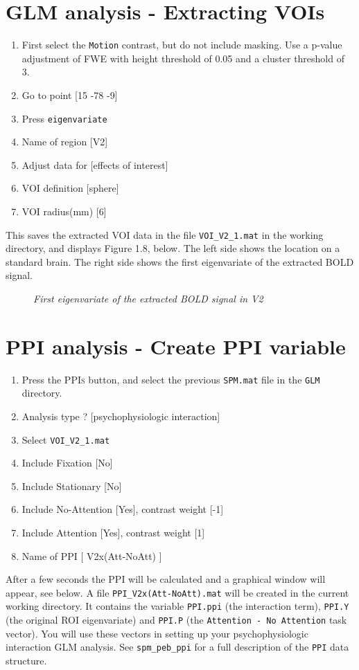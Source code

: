 \section{GLM analysis - Extracting VOIs}

\begin{enumerate}
\item First select the \texttt{Motion} contrast, but do not include masking. Use a p-value adjustment of FWE with height threshold of 0.05 and a cluster threshold of 3.
\item Go to point [15 -78 -9]
\item Press \texttt{eigenvariate}
\item Name of region [V2]
\item Adjust data for [effects of interest]
\item VOI definition [sphere]
\item VOI radius(mm) [6]
\end{enumerate}
This saves the extracted VOI data in the file \texttt{VOI\_V2\_1.mat} in the working directory, and displays Figure 1.8, below. The left side shows the location on a standard brain. The right side shows the first eigenvariate of the extracted BOLD signal.

\begin{figure}[!ht]
\centering{}
\caption{\em First eigenvariate of the extracted BOLD signal in V2}
\label{ppi_fig8}
\end{figure}

\section{PPI analysis - Create PPI variable}
\begin{enumerate}
\item Press the \textsc{PPIs} button, and select the previous \texttt{SPM.mat} file in the \texttt{GLM} directory.
\item Analysis type ? [psychophysiologic interaction]
\item Select \texttt{VOI\_V2\_1.mat}
\item Include Fixation [No]
\item Include Stationary [No]
\item Include No-Attention [Yes], contrast weight [-1]
\item Include Attention [Yes], contrast weight [1]
\item Name of PPI [ V2x(Att-NoAtt) ]
\end{enumerate}
After a few seconds the PPI will be calculated and a graphical window will appear, see below. A file \texttt{PPI\_V2x(Att-NoAtt).mat} will be created in the current working directory. It contains the variable \texttt{PPI.ppi} (the interaction term), \texttt{PPI.Y} (the original ROI eigenvariate) and \texttt{PPI.P} (the \texttt{Attention - No Attention} task vector). You will use these vectors in setting up your psychophysiologic interaction GLM analysis. See \texttt{spm\_peb\_ppi} for a full description of the \texttt{PPI} data structure. 

